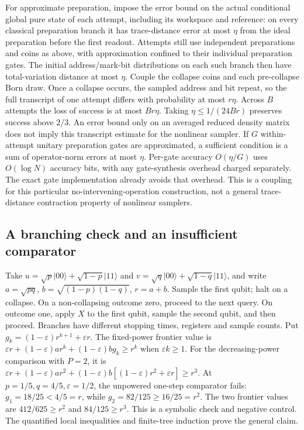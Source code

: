 \documentclass[11pt]{article}
\theoremstyle{remark}
\newcommand{\eps}{\varepsilon}
\newcommand{\ket}[1]{\lvert #1\rangle}
\begin{document}
For approximate preparation, impose the error bound on the actual conditional
global pure state of each attempt, including its workspace and reference:
on every classical preparation branch it has trace-distance error at most
$\eta$ from the ideal preparation before the first readout. Attempts still
use independent preparations and coins as above, with approximation confined
to their individual preparation gates. The initial address/mark-bit
distributions on each such branch then have total-variation distance at most
$\eta$. Couple the collapse coins and each pre-collapse Born draw. Once a
collapse occurs, the sampled address and bit repeat, so the full transcript
of one attempt differs with probability at most $r\eta$. Across $B$
attempts the loss of success is at most $Br\eta$. Taking
$\eta\le1/(24Br)$ preserves success above $2/3$.
An error bound only on an averaged reduced density matrix does not imply this
transcript estimate for the nonlinear sampler. If $G$ within-attempt unitary
preparation gates are approximated, a sufficient condition is a sum
of operator-norm errors at most $\eta$. Per-gate accuracy $O(\eta/G)$ uses
$O(\log N)$ accuracy bits, with any gate-synthesis overhead charged
separately. The exact gate implementation already avoids that overhead.
This is a coupling for this particular no-intervening-operation construction,
not a general trace-distance contraction property of nonlinear samplers.

\subsection{A branching check and an insufficient comparator}
Take $u=\sqrt p\ket{00}+\sqrt{1-p}\ket{11}$ and
$v=\sqrt q\ket{00}+\sqrt{1-q}\ket{11}$, and write
$a=\sqrt{pq}$, $b=\sqrt{(1-p)(1-q)}$, $r=a+b$.
Sample the first qubit; halt on a collapse. On a non-collapsing outcome zero,
proceed to the next query. On outcome one, apply $X$ to the first qubit,
sample the second qubit, and then proceed. Branches have different stopping
times, registers and sample counts. Put $g_k=(1-\eps)r^{k+1}+\eps r$.
The fixed-power frontier value is
$\eps r+(1-\eps)ar^k+(1-\eps)bg_k\ge r^k$ when $\eps k\ge1$.
For the decreasing-power comparison with $P=2$, it is
$\eps r+(1-\eps)ar^2+(1-\eps)b[(1-\eps)r^2+\eps r]\ge r^3$.
At $p=1/5,q=4/5,\eps=1/2$, the unpowered one-step comparator fails:
$g_1=18/25<4/5=r$, while $g_2=82/125\ge16/25=r^2$.
The two frontier values are $412/625\ge r^2$ and $84/125\ge r^3$.
This is a symbolic check and negative control. The quantified local
inequalities and finite-tree induction prove the general claim.
\end{document}
